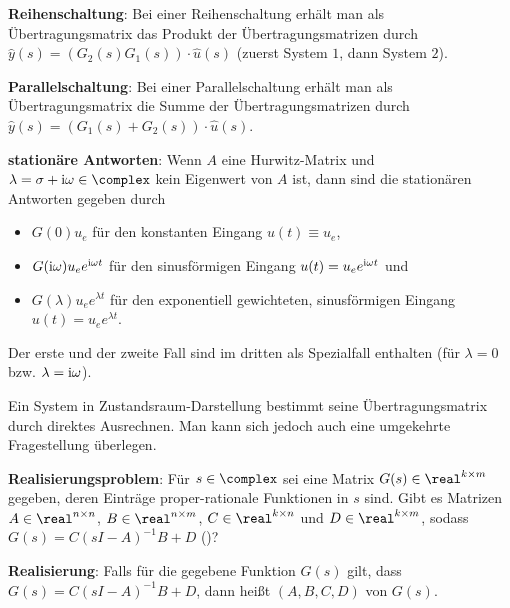 \textbf{Reihenschaltung}:
Bei einer Reihenschaltung erhält man als Übertragungsmatrix das Produkt der
Übertragungsmatrizen durch
$\widehat{y}(s) = (G_2(s) G_1(s)) \cdot \widehat{u}(s)$
(zuerst System $1$, dann System $2$).

\textbf{Parallelschaltung}:
Bei einer Parallelschaltung erhält man als Übertragungsmatrix die Summe der
Übertragungsmatrizen durch
$\widehat{y}(s) = (G_1(s) + G_2(s)) \cdot \widehat{u}(s)$.

\textbf{stationäre Antworten}:
Wenn $A$ eine Hurwitz-Matrix und $\lambda = \sigma + \iu \omega \in \complex$
kein Eigenwert von $A$ ist, dann sind die stationären Antworten gegeben durch
\begin{itemize}
    \item
    $G(0) u_e$ für den konstanten Eingang $u(t) \equiv u_e$,

    \item
    $G(\text{i}\omega) u_e e^{\text{i}\omega t}$ für den sinusförmigen Eingang
    $u(t) = u_e e^{\text{i}\omega t}$ und

    \item
    $G(\lambda) u_e e^{\lambda t}$ für den exponentiell gewichteten, sinusförmigen Eingang
    $u(t) = u_e e^{\lambda t}$.
\end{itemize}
Der erste und der zweite Fall sind im dritten als Spezialfall enthalten
(für $\lambda = 0$ bzw. $\lambda = \text{i}\omega$).

\linie

Ein System in Zustandsraum-Darstellung bestimmt seine Übertragungsmatrix durch direktes Ausrechnen.
Man kann sich jedoch auch eine umgekehrte Fragestellung überlegen.

\textbf{Realisierungsproblem}:
Für $s \in \complex$ sei eine Matrix $G(s) \in \real^{k \times m}$ gegeben,
deren Einträge proper-rationale Funktionen in $s$ sind.
Gibt es Matrizen $A \in \real^{n \times n}$, $B \in \real^{n \times m}$,
$C \in \real^{k \times n}$ und $D \in \real^{k \times m}$, sodass
$G(s) = C(sI - A)^{-1} B + D$
()?

\textbf{Realisierung}:
Falls für die gegebene Funktion $G(s)$ gilt,
dass $G(s) = C(sI - A)^{-1} B + D$, dann heißt $(A, B, C, D)$
 von $G(s)$.

